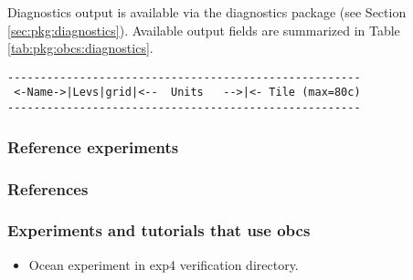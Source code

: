 Diagnostics output is available via the diagnostics package
(see Section \ref{sec:pkg:diagnostics}).
Available output fields are summarized in 
Table \ref{tab:pkg:obcs:diagnostics}.

\begin{table}[!ht]
\centering
\label{tab:pkg:obcs:diagnostics}
{\footnotesize
\begin{verbatim}
------------------------------------------------------
 <-Name->|Levs|grid|<--  Units   -->|<- Tile (max=80c)
------------------------------------------------------

\end{verbatim}
}
\caption{~}
\end{table}


\subsubsection{Reference experiments}




\subsubsection{References}

\subsubsection{Experiments and tutorials that use obcs}
\label{sec:pkg:obcs:experiments}

\begin{itemize}
\item{Ocean experiment in exp4 verification directory. }
\end{itemize}

